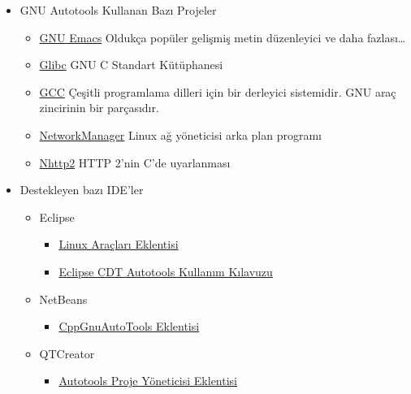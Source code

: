 \documentclass[
]{book}
\providecommand{\tightlist}{%
  \setlength{\itemsep}{0pt}\setlength{\parskip}{0pt}}
\begin{document}
\begin{itemize}
\tightlist
\item
  GNU Autotools Kullanan Bazı Projeler

  \begin{itemize}
  \tightlist
  \item
    \href{https://github.com/emacs-mirror/emacs}{GNU Emacs}
    Oldukça popüler gelişmiş metin düzenleyici ve daha fazlası\ldots{}
  \item
    \href{https://github.com/bminor/glibc}{Glibc}
    GNU C Standart Kütüphanesi
  \item
    \href{https://github.com/gcc-mirror/gcc}{GCC}
    Çeşitli programlama dilleri için bir derleyici sistemidir. GNU araç zincirinin bir parçasıdır.
  \item
    \href{https://gitlab.freedesktop.org/NetworkManager/NetworkManager}{NetworkManager}
    Linux ağ yöneticisi arka plan programı
  \item
    \href{https://github.com/nghttp2/nghttp2}{Nhttp2}
    HTTP 2'nin C'de uyarlanması
  \end{itemize}
\item
  Destekleyen bazı IDE'ler

  \begin{itemize}
  \tightlist
  \item
    Eclipse

    \begin{itemize}
    \tightlist
    \item
      \href{https://www.eclipse.org/linuxtools/}{Linux Araçları Eklentisi}
    \item
      \href{https://wiki.eclipse.org/CDT/Autotools/User_Guide}{Eclipse CDT Autotools Kullanım Kılavuzu}
    \end{itemize}
  \item
    NetBeans

    \begin{itemize}
    \tightlist
    \item
      \href{http://plugins.netbeans.org/plugin/51647/cppgnuautotools}{CppGnuAutoTools Eklentisi}
    \end{itemize}
  \item
    QTCreator

    \begin{itemize}
    \tightlist
    \item
      \href{https://doc.qt.io/qtcreator/creator-projects-autotools.html}{Autotools Proje Yöneticisi Eklentisi}
    \end{itemize}
  \end{itemize}
\end{itemize}
\end{document}
